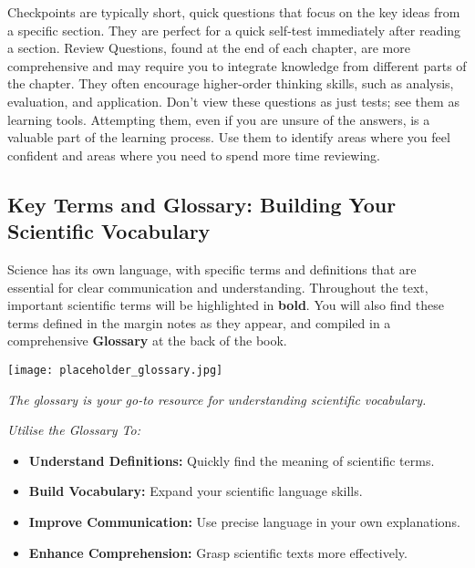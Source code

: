 Checkpoints are typically short, quick questions that focus on the key ideas from a specific section.  They are perfect for a quick self-test immediately after reading a section.  Review Questions, found at the end of each chapter, are more comprehensive and may require you to integrate knowledge from different parts of the chapter.  They often encourage higher-order thinking skills, such as analysis, evaluation, and application.  Don't view these questions as just tests; see them as learning tools.  Attempting them, even if you are unsure of the answers, is a valuable part of the learning process.  Use them to identify areas where you feel confident and areas where you need to spend more time reviewing.

\FloatBarrier

\subsection{Key Terms and Glossary: Building Your Scientific Vocabulary}

Science has its own language, with specific terms and definitions that are essential for clear communication and understanding.  Throughout the text, important scientific terms will be highlighted in \textbf{bold}.  You will also find these terms defined in the margin notes as they appear, and compiled in a comprehensive \textbf{Glossary} at the back of the book.

\begin{marginfigure}[0pt]
\texttt{[image: placeholder\_glossary.jpg]}
\caption*{}
\textit{The glossary is your go-to resource for understanding scientific vocabulary.}
\end{marginfigure}

\begin{marginnote}
\textit{Utilise the Glossary To:}
\begin{itemize}
    \item \textbf{Understand Definitions:}  Quickly find the meaning of scientific terms.
    \item \textbf{Build Vocabulary:}  Expand your scientific language skills.
    \item \textbf{Improve Communication:}  Use precise language in your own explanations.
    \item \textbf{Enhance Comprehension:}  Grasp scientific texts more effectively.
\end{itemize}
\end{marginnote}

